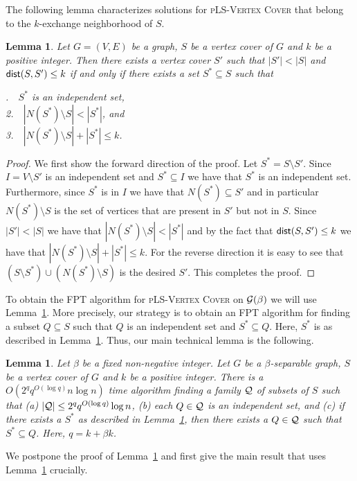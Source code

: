 \documentclass[10pt,usletter]{article}
\newcommand{\dist}{{\normalfont \textsf{dist}}}
\newcommand{\PLSVC}{\textsc{pLS-Vertex Cover}\xspace}
\newtheorem{lemma}[theorem]{Lemma}
\begin{document}
The following lemma characterizes solutions for \PLSVC that belong to the $k$-exchange neighborhood of $S$.

\begin{lemma}
\label{lem:structurallemma}
Let $G=(V,E)$ be a graph, $S$ be a vertex cover of $G$ and $k$ be a positive integer. Then there exists a 
vertex cover $S'$ such that $|S'|<|S|$ and $\dist(S,S')\leq k$ if and only if there exists a set $S^*\subseteq S$ such that

\smallskip
{}.~~$S^*$ is an independent set,\\
2.~~$|N(S^*)\setminus S|< |S^*|$, and\\ 
3.~~$|N(S^*)\setminus S|+|S^*|\leq k$. 
\end{lemma}
\begin{proof}
We first show the forward direction of the proof. Let $S^*=S\setminus S'$. Since $I=V\setminus S'$ is an independent set  
and $S^*\subseteq I $ we have that $S^*$ is an independent set.  Furthermore, since $S^*$ is in $I$ we have that $N(S^*)\subseteq S'$ 
and in particular $N(S^*)\setminus S$ is the set of vertices that are present in $S'$ but not in $S$. Since $|S'|<|S|$ we have that $|N(S^*)\setminus S|< |S^*|$ and by the fact that $\dist(S,S')\leq k$ we have that $|N(S^*)\setminus S|+|S^*|\leq k$. For the reverse direction it is easy to see that 
$(S\setminus S^*) \cup (N(S^*)\setminus S)$ is the desired $S'$. This completes the proof. 
\end{proof}

To obtain the FPT algorithm for  \PLSVC  on ${\cal G}(\beta)$ we will use Lemma~\ref{lem:structurallemma}. More 
precisely, our strategy is to obtain an FPT algorithm for  finding a subset $Q\subseteq S$ such that $Q$ is an independent set and 
$S^* \subseteq Q $. Here, $S^*$ is as described in Lemma~\ref{lem:structurallemma}. Thus, our main technical lemma is 
the following.

\begin{lemma}
\label{lem:mainlemma}
Let $\beta$ be a fixed non-negative integer.
Let $G$ be a $\beta$-separable graph, $S$ be a vertex cover of $G$ and $k$ be a positive integer.
There is a $O(2^q q^{O(\log q)} n \log n)$ time algorithm finding a family ${\cal Q}$ of 
subsets of $S$ such that (a) $|{\cal Q}|\leq 2^q q^{O(\log q)} \log n$, (b) each $Q\in {\cal Q}$ is an independent set, and (c) 
if there exists a $S^*$ as
described in Lemma~\ref{lem:structurallemma}, then there exists a $Q\in \cal Q$ such that $S^* \subseteq Q $. Here, $q=k+\beta k$.
\end{lemma}
We postpone the proof of Lemma~\ref{lem:mainlemma} and first give the main result that uses Lemma~\ref{lem:mainlemma} crucially. 
\end{document}
